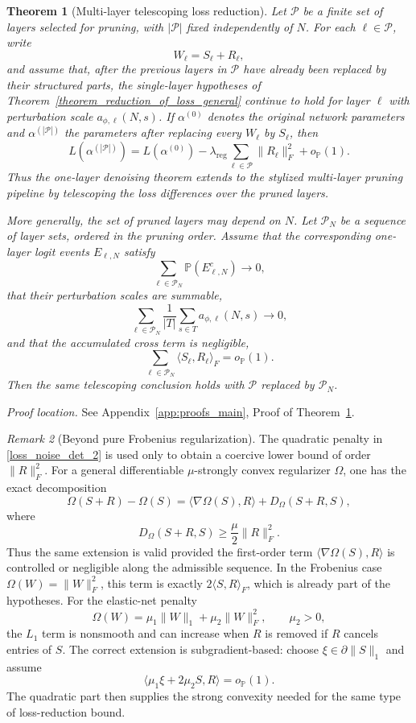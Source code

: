 \documentclass[11pt]{article}
\theoremstyle{plain}
\newtheorem{thm}{Theorem}[section]
\theoremstyle{definition}
\theoremstyle{remark}
\newtheorem{rem}[thm]{Remark}
\newcommand{\PP}{\mathbb{P}}
\newcommand{\1}{\mathbf{1}}
\newcommand{\proofloc}[1]{\par\noindent\emph{Proof location.} #1\par}
\begin{document}
\begin{thm}[Multi-layer telescoping loss reduction]
\label{thm:multilayer_telescoping}
Let \(\mathcal P\) be a finite set of layers selected for pruning, with \(|\mathcal P|\) fixed independently of \(N\). For each \(\ell\in\mathcal P\), write
\[
W_\ell=S_\ell+R_\ell,
\]
and assume that, after the previous layers in \(\mathcal P\) have already been replaced by their structured parts, the single-layer hypotheses of Theorem~\ref{theorem_reduction_of_loss_general} continue to hold for layer \(\ell\) with perturbation scale \(a_{\phi,\ell}(N,s)\). If \(\alpha^{(0)}\) denotes the original network parameters and \(\alpha^{(|\mathcal P|)}\) the parameters after replacing every \(W_\ell\) by \(S_\ell\), then
\[
L(\alpha^{(|\mathcal P|)})
=
L(\alpha^{(0)})
-\lambda_{\mathrm{reg}}\sum_{\ell\in\mathcal P}\|R_\ell\|_F^2
+o_{\PP}(1).
\]
Thus the one-layer denoising theorem extends to the stylized multi-layer pruning pipeline by telescoping the loss differences over the pruned layers.

More generally, the set of pruned layers may depend on \(N\). Let \(\mathcal P_N\) be a sequence of layer sets, ordered in the pruning order. Assume that the corresponding one-layer logit events \(E_{\ell,N}\) satisfy
\[
\sum_{\ell\in\mathcal P_N}\PP(E_{\ell,N}^c)\to0,
\]
that their perturbation scales are summable,
\[
\sum_{\ell\in\mathcal P_N}\frac{1}{|T|}\sum_{s\in T}a_{\phi,\ell}(N,s)\to0,
\]
and that the accumulated cross term is negligible,
\[
\sum_{\ell\in\mathcal P_N}\langle S_\ell,R_\ell\rangle_F=o_{\PP}(1).
\]
Then the same telescoping conclusion holds with \(\mathcal P\) replaced by \(\mathcal P_N\).
\end{thm}
\proofloc{See Appendix~\ref{app:proofs_main}, Proof of Theorem~\ref{thm:multilayer_telescoping}.}

\begin{rem}[Beyond pure Frobenius regularization]
\label{rem:bregman_regularizer}
The quadratic penalty in \eqref{loss_noise_det_2} is used only to obtain a coercive lower bound of order \(\|R\|_F^2\). For a general differentiable \(\mu\)-strongly convex regularizer \(\Omega\), one has the exact decomposition
\[
\Omega(S+R)-\Omega(S)
=
\langle \nabla\Omega(S),R\rangle + D_\Omega(S+R,S),
\]
where
\[
D_\Omega(S+R,S)\ge \frac{\mu}{2}\|R\|_F^2.
\]
Thus the same extension is valid provided the first-order term \(\langle \nabla\Omega(S),R\rangle\) is controlled or negligible along the admissible sequence. In the Frobenius case \(\Omega(W)=\|W\|_F^2\), this term is exactly \(2\langle S,R\rangle_F\), which is already part of the hypotheses. For the elastic-net penalty
\[
\Omega(W)=\mu_1\|W\|_1+\mu_2\|W\|_F^2,
\qquad \mu_2>0,
\]
the \(L_1\) term is nonsmooth and can increase when \(R\) is removed if \(R\) cancels entries of \(S\). The correct extension is subgradient-based: choose \(\xi\in\partial\|S\|_1\) and assume
\[
\langle \mu_1\xi+2\mu_2S,R\rangle=o_{\PP}(1).
\]
The quadratic part then supplies the strong convexity needed for the same type of loss-reduction bound.
\end{rem}
\end{document}
